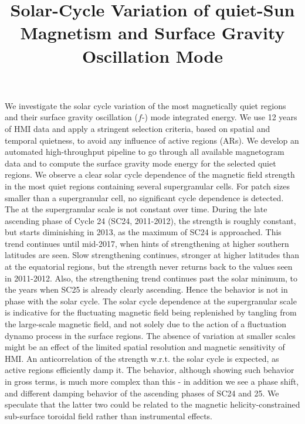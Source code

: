 \documentclass{aa}
\begin{document}
\title{Solar-Cycle Variation of quiet-Sun Magnetism and Surface Gravity Oscillation Mode}



{We investigate the solar cycle variation of the most magnetically quiet regions and
their surface gravity oscillation ($f$-) mode integrated 
energy.
}
{We use 12 years of HMI data and apply a stringent selection criteria, based on
spatial and temporal quietness, to avoid any influence of active regions (ARs).
We develop an automated high-throughput pipeline to go through all available magnetogram data
and to compute the surface gravity mode 
energy
for the selected quiet regions.}
{We observe a clear solar cycle dependence of the magnetic field strength in the most
quiet regions containing several supergranular cells. For patch sizes smaller than a supergranular
cell, no significant cycle dependence is detected. The \fff at the supergranular scale 
is not constant over time.
During the late ascending phase of Cycle 24 (SC24, 2011-2012), the \fff strength is roughly constant, but starts diminishing in 2013, as the maximum of SC24 is approached. This trend continues
until 
mid-2017,
when
hints of strengthening at higher southern latitudes
are seen.
Slow strengthening continues, stronger at higher latitudes than at the equatorial regions, but the \fff strength never returns back to the values seen in 2011-2012. Also, the strengthening trend continues past the solar minimum, to the years when SC25 is already clearly ascending. Hence the \fff behavior is not in phase with the solar cycle. 
}
{The solar cycle dependence at the supergranular scale is indicative for the fluctuating magnetic
field being replenished by tangling from the large-scale magnetic field, and not solely due to
the action of a fluctuation dynamo process in the surface regions. 
The absence of variation at smaller scales might be an effect of the
limited spatial resolution and magnetic sensitivity of HMI.
An anticorrelation of the \fff strength w.r.t. the solar cycle is expected, as active regions efficiently damp it. The \fff behavior, although showing such behavior in gross terms, is much more complex than this - in addition we see a phase shift, and different damping behavior of the ascending phases of SC24 and 25. We speculate that the latter two could be related to the magnetic helicity-constrained sub-surface toroidal field rather than instrumental effects. 
}
\end{document}
